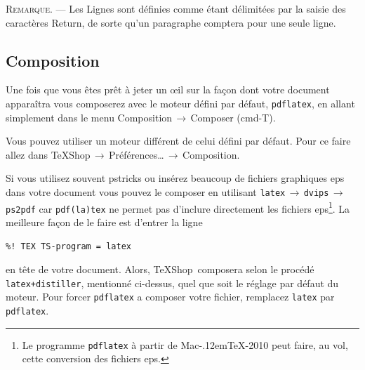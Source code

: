 \documentclass[11pt,french]{article}
\newcommand{\MacTeX}{Mac\kern-.12em\TeX}
\newcommand{\TS}{\textsf{\TeX Shop}}
\newcommand{\acr}[1]{\textsf{#1}}
\newcommand{\cmd}[1]{\textsf{#1}}
\newcommand{\mnu}[1]{\textsf{#1}}
\newcommand{\To}{\,\(\to\)\,}
\begin{document}
\textsc{Remarque}. --- Les \textsf{Lignes} sont définies comme étant délimitées par la saisie des caractères \cmd{Return}, de sorte qu'un paragraphe comptera pour une seule ligne.

%
\subsection{Composition} 

Une fois que vous êtes prêt à jeter un \oe{}il sur la façon dont votre document apparaîtra vous composerez avec le moteur défini par défaut, \texttt{pdflatex}, en allant simplement dans le menu \mnu{Composition}\To\mnu{Composer} (\cmd{cmd-T}).

Vous pouvez utiliser un moteur différent de celui défini par défaut. Pour ce faire allez dans \mnu{TeXShop}\To\mnu{Préférences…}\To\mnu{Composition}.

Si vous utilisez souvent \cmd{pstricks} ou insérez beaucoup de fichiers graphiques \acr{eps} dans votre document vous pouvez le composer en utilisant \texttt{latex}\To\texttt{dvips}\To\texttt{ps2pdf} car \texttt{pdf(la)tex} ne permet pas d'inclure directement les fichiers \acr{eps}\footnote{Le programme \texttt{pdflatex} à partir de \MacTeX-2010 peut faire, au vol, cette conversion des fichiers \acr{eps}.}. La meilleure façon de le faire est d'entrer la ligne
\begin{verbatim}
%! TEX TS-program = latex
\end{verbatim}
en tête de votre document. Alors, \TS\ composera selon le procédé \texttt{latex+distiller}, mentionné ci-dessus, quel que soit le réglage par défaut du moteur. Pour forcer \texttt{pdflatex} a composer votre fichier, remplacez \texttt{latex} par \texttt{pdflatex}.

%
%
\end{document}
